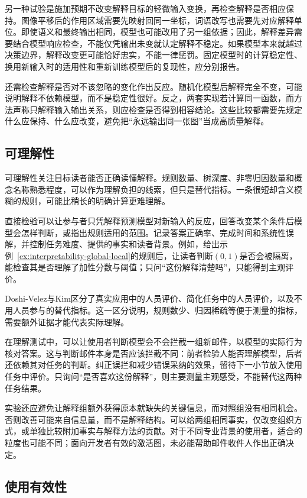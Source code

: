 另一种试验是施加预期不改变解释目标的轻微输入变换，再检查解释是否相应保持。图像平移后的作用区域需要先映射回同一坐标，词语改写也需要先对应解释单位。即使语义和最终输出相同，模型也可能改用了另一组依据；因此，解释差异需要结合模型响应检查，不能仅凭输出未变就认定解释不稳定。如果模型本来就越过决策边界，解释改变更可能恰好忠实，不能一律惩罚。固定模型时的计算稳定性、换用新输入时的适用性和重新训练模型后的复现性，应分别报告。

还需检查解释是否对不该忽略的变化作出反应。随机化模型后解释完全不变，可能说明解释不依赖模型，而不是稳定性很好。反之，两套实现若计算同一函数，而方法声称只解释输入输出关系，则应检查是否得到相容结论。这些比较都需要先规定什么应保持、什么应改变，避免把“永远输出同一张图”当成高质量解释。

\subsection{可理解性}
\label{sec:interpretability-quality-comprehensibility}

可理解性关注目标读者能否正确读懂解释。规则数量、树深度、非零归因数量和概念名称熟悉程度，可以作为理解负担的线索，但只是替代指标。一条很短却含义模糊的规则，可能比稍长的明确计算更难理解。

直接检验可以让参与者只凭解释预测模型对新输入的反应，回答改变某个条件后模型会怎样判断，或指出规则适用的范围。记录答案正确率、完成时间和系统性误解，并控制任务难度、提供的事实和读者背景。例如，给出示例~\ref{ex:interpretability-global-local}的规则后，让读者判断$(0,1)$是否会被隔离，能检查其是否理解了加性分数与阈值；只问“这份解释清楚吗”，只能得到主观评价。

Doshi-Velez与Kim区分了真实应用中的人员评价、简化任务中的人员评价，以及不用人员参与的替代指标。这一区分说明，规则数少、归因稀疏等便于测量的指标，需要额外证据才能代表实际理解。

在理解测试中，可以让使用者判断模型会不会拦截一组新邮件，以模型的实际行为核对答案。这与判断邮件本身是否应该拦截不同：前者检验人能否理解模型，后者还依赖其对任务的判断。纠正误拦和减少错误采纳的效果，留待下一小节放入使用任务中评价。只询问“是否喜欢这份解释”，则主要测量主观感受，不能替代这两种任务结果。

实验还应避免让解释组额外获得原本就缺失的关键信息，而对照组没有相同机会。否则改善可能来自信息量，而不是解释结构。可以给两组相同事实，仅改变组织方式，或单独比较附加事实与解释方法的贡献。对于不同专业背景的使用者，适合的粒度也可能不同；面向开发者有效的激活图，未必能帮助邮件收件人作出正确决定。

\subsection{使用有效性}
\label{sec:interpretability-quality-utility}


